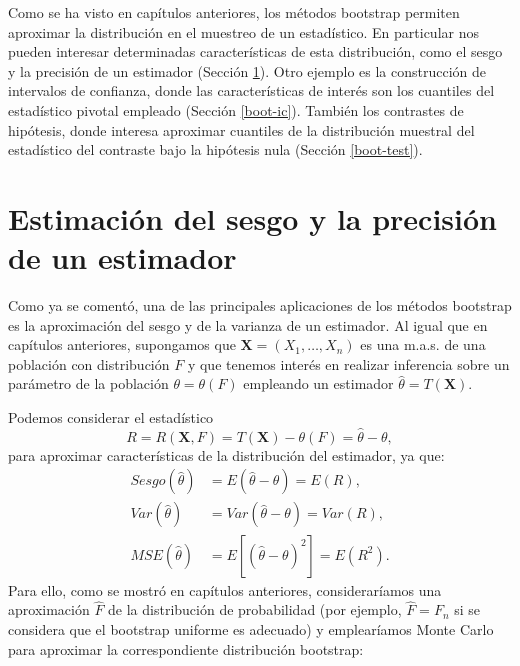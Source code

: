 \documentclass[
  10pt,
]{book}
\renewcommand{\mathbf}[1]{\symbf{#1}}
\theoremstyle{break}
\theoremstyle{nonumberplain}
\begin{document}
Como se ha visto en capítulos anteriores, los métodos bootstrap permiten aproximar la distribución en el muestreo de un estadístico.
En particular nos pueden interesar determinadas características de esta distribución, como el sesgo y la precisión de un estimador (Sección \ref{sesgo-prec}).
Otro ejemplo es la construcción de intervalos de confianza, donde las características de interés son los cuantiles del estadístico pivotal empleado (Sección \ref{boot-ic}).
También los contrastes de hipótesis, donde interesa aproximar cuantiles de la distribución muestral del estadístico del contraste bajo la hipótesis nula (Sección \ref{boot-test}).

\hypertarget{sesgo-prec}{%
\section{Estimación del sesgo y la precisión de un estimador}\label{sesgo-prec}}

Como ya se comentó, una de las principales aplicaciones de los métodos bootstrap es la aproximación del sesgo y de la varianza de un estimador.
Al igual que en capítulos anteriores, supongamos que \(\mathbf{X}=\left( X_1,\ldots ,X_n \right)\) es una m.a.s. de una población con distribución \(F\) y que tenemos interés en realizar inferencia sobre un parámetro de la población \(\theta =\theta \left( F \right)\) empleando un estimador \(\hat{\theta}=T\left( \mathbf{X} \right)\).

Podemos considerar el estadístico
\[R=R\left( \mathbf{X}, F \right) = T\left( \mathbf{X} \right) - \theta \left( F \right) = \hat{\theta} - \theta,\]
para aproximar características de la distribución del estimador, ya que:
\[\begin{aligned}
Sesgo\left( \hat{\theta} \right) &= E\left( \hat{\theta}-\theta \right)
=E\left( R \right), \\
Var\left( \hat{\theta} \right) &= Var\left( \hat{\theta}-\theta \right)
=Var\left( R \right), \\
MSE\left( \hat{\theta} \right) &= E\left[ \left( \hat{\theta}-\theta \right)
^2\right] =E\left( R^2 \right).
\end{aligned}\]
Para ello, como se mostró en capítulos anteriores, consideraríamos una aproximación \(\hat{F}\) de la distribución de probabilidad (por ejemplo, \(\hat{F}=F_n\) si se considera que el bootstrap uniforme es adecuado) y emplearíamos Monte Carlo para aproximar la correspondiente distribución bootstrap:
\end{document}

